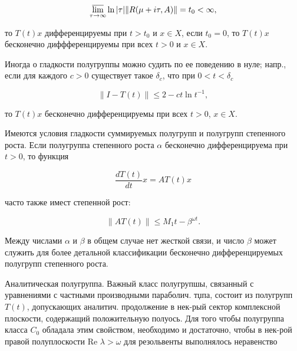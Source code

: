 \documentclass[10pt]{article}
\begin{document}
\[

\varlimsup_{\tau \rightarrow \infty} \ln |\tau|\|R(\mu+i \tau, A)\|=t_{0}<\infty,

\]



то $T(t) x$ дифференцируемы при $t>t_{0}$ и $x \in X$, если $t_{0}=0$, то $T(t) x$ бесконечно диффференцируемы при всех $t>0$ и $x \in X$.



Иногда о гладкости полугруппы можно судить по ее поведению в нуле; напр., если для каждого $c>0$ существует такое $\delta_{c}$, что при $0<t<\delta_{c}$



\[

\|I-T(t)\| \leqslant 2-c t \ln t^{-1},

\]



то $T(t) x$ бесконечно дифференцируемы при всех $t>0$, $x \in X$.



Имеются условия гладкости суммируемых полугрупп и полугрупп степенного роста. Если полугруппа степенного роста $\alpha$ бесконечно дифференцируема при $t>0$, то функция



\[

\frac{d T(t)}{d t} x=A T(t) x

\]



часто также имест степенной рост:



\[

\|A T(t)\| \leqslant M_{1} t-\beta^{\omega t} .

\]



Между числами $\alpha$ и $\beta$ в общем случае нет жесткой связи, и число $\beta$ может служить для более детальной классификации бесконечно дифференцируемых полугрупп степенного роста.



Аналитическая полугруппа. Важный класс полугрупшы, связанный с уравнениями с частными производными параболич. тџпа, состоит из полугрупп $T(t)$, допускающих аналитич. продолжение в нек-рый сектор комплексной плоскости, содержащий положительную полуось. Для того чтобы полугруппа класса $C_{0}$ обладала этим свойством, необходимо и достаточно, чтобы в нек-рой правой полуплоскости Re $\lambda>\omega$ для резольвенты выполнялось неравенство
\end{document}
